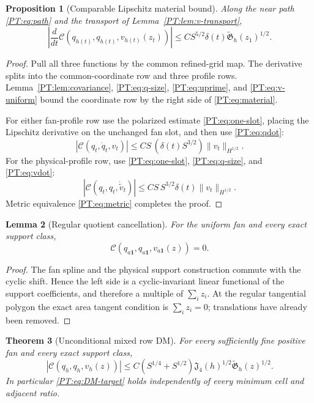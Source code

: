 \documentclass[11pt]{amsart}
\numberwithin{equation}{section}
\newtheorem{theorem}{Theorem}[section]
\newtheorem{proposition}[theorem]{Proposition}
\newtheorem{lemma}[theorem]{Lemma}
\theoremstyle{definition}
\theoremstyle{remark}
\newcommand{\Jfour}{\mathfrak J_4}
\newcommand{\Gtilde}{\widetilde{\mathfrak G}}
\newcommand{\Cnull}{\mathcal C}
\begin{document}
\begin{proposition}[Comparable Lipschitz material bound]
\label{PT:prop:material}
Along the near path \eqref{PT:eq:path} and the transport of
Lemma~\ref{PT:lem:v-transport},
\begin{equation}\label{PT:eq:material}
 \boxed{
 \left|\frac d{dt}
 \Cnull(q_{h(t)},q_{h(t)},v_{h(t)}(z_t))\right|
 \le CS^{5/2}\delta(t)\Gtilde_h(z_1)^{1/2}.}
\end{equation}
\end{proposition}

\begin{proof}
Pull all three functions by the common refined-grid map.  The derivative
splits into the common-coordinate row and three profile rows.
Lemma~\ref{PT:lem:covariance}, \eqref{PT:eq:q-size},
\eqref{PT:eq:uprime}, and \eqref{PT:eq:v-uniform} bound the coordinate row by
the right side of \eqref{PT:eq:material}.

For either fan-profile row use the polarized estimate
\eqref{PT:eq:one-slot}, placing the Lipschitz derivative on the unchanged
fan slot, and then use \eqref{PT:eq:qdot}:
\[
 |\Cnull(q_t,\dot q_t,v_t)|
 \le C S\,(\delta(t)S^{3/2})\|v_t\|_{H^{1/2}}.
\]
For the physical-profile row, use \eqref{PT:eq:one-slot},
\eqref{PT:eq:q-size}, and \eqref{PT:eq:vdot}:
\[
 |\Cnull(q_t,q_t,\dot{\widetilde v}_t)|
 \le C S\,S^{3/2}\delta(t)\|v_t\|_{H^{1/2}}.
\]
Metric equivalence \eqref{PT:eq:metric} completes the proof.
\end{proof}

\begin{lemma}[Regular quotient cancellation]\label{PT:lem:regular}
For the uniform fan and every exact support class,
\begin{equation}\label{PT:eq:regular}
 \Cnull(q_{a\mathbf1},q_{a\mathbf1},v_{a\mathbf1}(z))=0.
\end{equation}
\end{lemma}

\begin{proof}
The fan spline and the physical support construction commute with the
cyclic shift.  Hence the left side is a cyclic-invariant linear functional
of the support coefficients, and therefore a multiple of $\sum_i z_i$.
At the regular tangential polygon the exact area tangent condition is
$\sum_i z_i=0$; translations have already been removed.
\end{proof}

\begin{theorem}[Unconditional mixed row DM]\label{PT:thm:DM}
For every sufficiently fine positive fan and every exact support class,
\begin{equation}\label{PT:eq:DM}
 \boxed{
 |\Cnull(q_h,q_h,v_h(z))|
 \le C(S^{1/4}+S^{1/2})\Jfour(h)^{1/2}
       \Gtilde_h(z)^{1/2}.}
\end{equation}
In particular \eqref{PT:eq:DM-target} holds independently of every minimum
cell and adjacent ratio.
\end{theorem}
\end{document}
